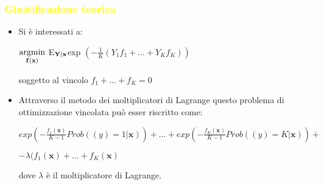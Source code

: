\documentclass[handout
]{beamer}
\def\yellow#1{{\textcolor{yellow}{#1}}}
\begin{document}
\begin{frame}
\frametitle{\yellow{Giustificazione teorica}}
\begin{itemize}
 \item Si \`e interessati a:
\begin{center}
 \begin{math} \underset{\begin{bf}f(x)\end{bf}}{\operatorname{argmin}}\end{math} 
E\begin{math}_{\begin{bf}Y|x\end{bf}} \end{math}exp
\begin{math}(-\frac{1}{K}(Y_1f_1 + ... + Y_Kf_K))
\end{math}
\end{center}
\begin{center}
 soggetto al vincolo \begin{math}f_1 + ... + f_K = 0
\end{math}
\end{center}
 
\item Attraverso il metodo dei moltiplicatori di Lagrange questo problema di ottimizzazione vincolata pu\`o 
esser riscritto come:
\begin{center}
 \begin{math}
  exp (-\frac{f_1(\textbf{x})}{K-1} Prob((y)=1|\textbf{x})) + \dots 
+ exp (-\frac{f_K(\textbf{x})}{K-1} Prob((y)=K|\textbf{x})) + 
 \end{math}
\end{center}
\begin{center}
 \begin{math}
-  \lambda (f_1(\textbf{x}) + \dots + f_K(\textbf{x})
 \end{math}

\end{center}
dove \begin{math}
      \lambda 
     \end{math}  \`e il moltiplicatore di Lagrange.


\end{itemize}
\end{frame}
\end{document}
